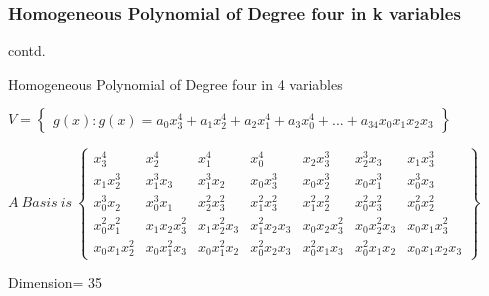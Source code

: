 \documentclass{beamer}
\newenvironment{changemargin}[2]{%
  \begin{list}{}{%
    \setlength{\topsep}{0pt}%
    \setlength{\leftmargin}{#1}%
    \setlength{\rightmargin}{#2}%
    \setlength{\listparindent}{\parindent}%
    \setlength{\itemindent}{\parindent}%
    \setlength{\parsep}{\parskip}%
  }%
  \item[]}{\end{list}}
\begin{document}
\begin{frame}  
\frametitle{Homogeneous Polynomial of Degree four in k variables}
\begin{block}{contd.}
\begin{itemize}
    \item Homogeneous Polynomial of Degree four in 4 variables\\
\begin{changemargin}{-4pt}{0pt}
{$V=\begin{Bmatrix}
g(x):g(x)=a_{0}x_{3}^{4}+a_{1}x_{2}^{4}+a_{2}x_{1}^{4}+a_{3}x_{0}^{4}+...+a_{34}x_{0}x_{1}x_{2}x_{3}
\end{Bmatrix}$}
\end{changemargin}

\begin{changemargin}{-24pt}{0pt}
$A~Basis~is~\begin{Bmatrix} x_{3}^{4}& x_{2}^{4}& x_{1}^{4}& x_{0}^{4}& x_{2}x_{3}^{3}& x_{2}^{3}x_{3}& x_{1}x_{3}^{3}\\
x_{1}x_{2}^{3}& x_{1}^{3}x_{3}& x_{1}^{3}x_{2}& x_{0}x_{3}^{3}& x_{0}x_{2}^{3}& x_{0}x_{1}^{3}& x_{0}^{3}x_{3}\\
x_{0}^{3}x_{2}& x_{0}^{3}x_{1}& x_{2}^{2}x_{3}^{2}& x_{1}^{2}x_{3}^{2}& x_{1}^{2}x_{2}^{2}& x_{0}^{2}x_{3}^{2}& x_{0}^{2}x_{2}^{2}\\
x_{0}^{2}x_{1}^{2}& x_{1}x_{2}x_{3}^{2}& x_{1}x_{2}^{2}x_{3}& x_{1}^{2}x_{2}x_{3}& x_{0}x_{2}x_{3}^{2}& x_{0}x_{2}^{2}x_{3}& x_{0}x_{1}x_{3}^{2}\\
x_{0}x_{1}x_{2}^{2}& x_{0}x_{1}^{2}x_{3}& x_{0}x_{1}^{2}x_{2}& x_{0}^{2}x_{2}x_{3}& x_{0}^{2}x_{1}x_{3}& x_{0}^{2}x_{1}x_{2}& x_{0}x_{1}x_{2}x_{3} \end{Bmatrix}$
\end{changemargin}
Dimension= 35
\end{itemize}
\end{block}
\end{frame}
\end{document}
